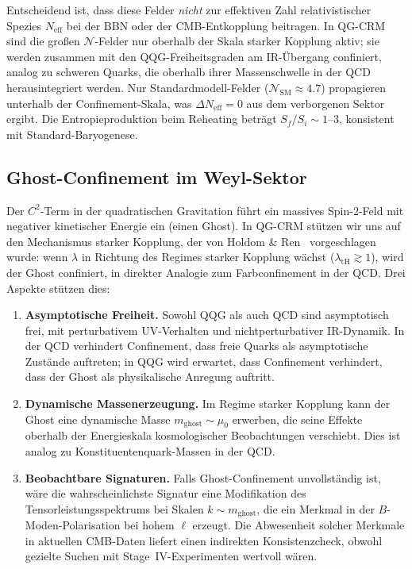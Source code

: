 \documentclass[aps,prd,twocolumn,superscriptaddress,nofootinbib]{revtex4-2}
\begin{document}
Entscheidend ist, dass diese Felder \textit{nicht} zur effektiven Zahl relativistischer Spezies $N_\mathrm{eff}$ bei der BBN oder der CMB-Entkopplung beitragen. In QG-CRM sind die großen $\mathcal{N}$-Felder nur oberhalb der Skala starker Kopplung aktiv; sie werden zusammen mit den QQG-Freiheitsgraden am IR-Übergang confiniert, analog zu schweren Quarks, die oberhalb ihrer Massenschwelle in der QCD herausintegriert werden. Nur Standardmodell-Felder ($\mathcal{N}_\mathrm{SM} \approx 4.7$) propagieren unterhalb der Confinement-Skala, was $\Delta N_\mathrm{eff} = 0$ aus dem verborgenen Sektor ergibt. Die Entropieproduktion beim Reheating beträgt $S_f/S_i \sim 1$--$3$, konsistent mit Standard-Baryogenese.

\subsection{Ghost-Confinement im Weyl-Sektor}
\label{sec:ghost}

Der $C^2$-Term in der quadratischen Gravitation führt ein massives Spin-2-Feld mit negativer kinetischer Energie ein (einen Ghost). In QG-CRM stützen wir uns auf den Mechanismus starker Kopplung, der von Holdom \& Ren~\cite{HoldomRen2016} vorgeschlagen wurde: wenn $\lambda$ in Richtung des Regimes starker Kopplung wächst ($\lambda_\mathrm{tH} \gtrsim 1$), wird der Ghost confiniert, in direkter Analogie zum Farbconfinement in der QCD. Drei Aspekte stützen dies:

\begin{enumerate}
\item \textbf{Asymptotische Freiheit.} Sowohl QQG als auch QCD sind asymptotisch frei, mit perturbativem UV-Verhalten und nichtperturbativer IR-Dynamik. In der QCD verhindert Confinement, dass freie Quarks als asymptotische Zustände auftreten; in QQG wird erwartet, dass Confinement verhindert, dass der Ghost als physikalische Anregung auftritt.

\item \textbf{Dynamische Massenerzeugung.} Im Regime starker Kopplung kann der Ghost eine dynamische Masse $m_\mathrm{ghost} \sim \mu_0$ erwerben, die seine Effekte oberhalb der Energieskala kosmologischer Beobachtungen verschiebt. Dies ist analog zu Konstituentenquark-Massen in der QCD.

\item \textbf{Beobachtbare Signaturen.} Falls Ghost-Confinement unvollständig ist, wäre die wahrscheinlichste Signatur eine Modifikation des Tensorleistungsspektrums bei Skalen $k \sim m_\mathrm{ghost}$, die ein Merkmal in der $B$-Moden-Polarisation bei hohem $\ell$ erzeugt. Die Abwesenheit solcher Merkmale in aktuellen CMB-Daten liefert einen indirekten Konsistenzcheck, obwohl gezielte Suchen mit Stage~IV-Experimenten wertvoll wären.
\end{enumerate}
\end{document}
